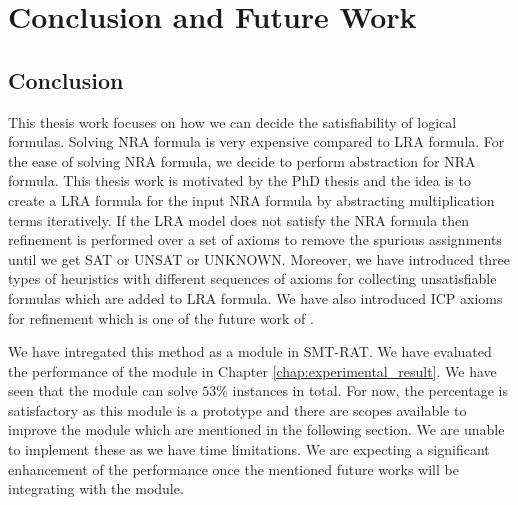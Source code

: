 \chapter{Conclusion and Future Work}
\label{chap:conclusion_and_Future_Work}
\section{Conclusion}
\label{sec:Conclusion}
This thesis work focuses on how we can decide the satisfiability of logical formulas.
Solving NRA formula is very expensive compared to LRA formula.
For the ease of solving NRA formula, we decide to perform abstraction for NRA formula.
This thesis work is motivated by the PhD thesis \cite{Cimatti:2018:ILS:3274693.3230639} and the idea is to create a LRA formula for the input NRA formula by abstracting multiplication terms iteratively.
If the LRA model does not satisfy the NRA formula then refinement is performed over a set of axioms to remove the spurious assignments until we get SAT or UNSAT or UNKNOWN.
Moreover, we have introduced three types of heuristics with different sequences of axioms for collecting unsatisfiable formulas which are added to LRA formula.
We have also introduced ICP axioms for refinement which is one of the future work of \cite{Cimatti:2018:ILS:3274693.3230639}.\newline

\noindent We have intregated this method as a module in SMT-RAT.
We have evaluated the performance of the module in Chapter \ref{chap:experimental_result}.
We have seen that the module can solve $53\%$ instances in total.
For now, the percentage is satisfactory as this module is a prototype and there are scopes available to improve the module which are mentioned in the following section.
We are unable to implement these as we have time limitations.
We are expecting a significant enhancement of the performance once the mentioned future works will be integrating with the module.

